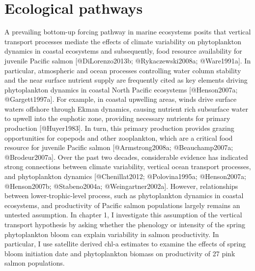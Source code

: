 \section{Ecological pathways}\label{ecological-pathways}

A prevailing bottom-up forcing pathway in marine ecosystems posits that
vertical transport processes mediate the effects of climate variability
on phytoplankton dynamics in coastal ecosystems and subsequently, food
resource availability for juvenile Pacific salmon {[}@DiLorenzo2013b;
@Rykaczewski2008a; @Ware1991a{]}. In particular, atmospheric and ocean
processes controlling water column stability and the near surface
nutrient supply are frequently cited as key elements driving
phytoplankton dynamics in coastal North Pacific ecosystems
{[}@Henson2007a; @Gargett1997a{]}. For example, in coastal upwelling
areas, winds drive surface waters offshore through Ekman dynamics,
causing nutrient rich subsurface water to upwell into the euphotic zone,
providing necessary nutrients for primary production {[}@Huyer1983{]}.
In turn, this primary production provides grazing opportunities for
copepods and other zooplankton, which are a critical food resource for
juvenile Pacific salmon {[}@Armstrong2008a; @Beauchamp2007a;
@Brodeur2007a{]}. Over the past two decades, considerable evidence has
indicated strong connections between climate variability, vertical ocean
transport processes, and phytoplankton dynamics {[}@Chenillat2012;
@Polovina1995a; @Henson2007a; @Henson2007b; @Stabeno2004a;
@Weingartner2002a{]}. However, relationships between lower-trophic-level
process, such as phytoplankton dynamics in coastal ecosystems, and
productivity of Pacific salmon populations largely remains an untested
assumption. In chapter 1, I investigate this assumption of the vertical
transport hypothesis by asking whether the phenology or intensity of the
spring phytoplankton bloom can explain variability in salmon
productivity. In particular, I use satellite derived chl-a estimates to
examine the effects of spring bloom initiation date and phytoplankton
biomass on productivity of 27 pink salmon populations.

